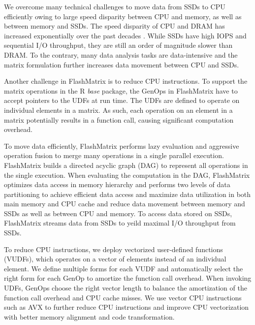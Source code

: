 We overcome many technical challenges to move data from SSDs to CPU efficiently
owing to large speed disparity between CPU and memory, as well as between memory and
SSDs. The speed disparity of CPU and DRAM has increased exponentially over
the past decades \cite{Wilkes01}. While SSDs have high IOPS and sequential
I/O throughput, they are still an order of magnitude slower than DRAM.
To the contrary, many data analysis tasks are data-intensive and the matrix
formulation further increases data movement between CPU and SSDs.%

Another challenge in FlashMatrix is to reduce CPU instructions. To support
the matrix operations in the R \textit{base} package, the GenOps in FlashMatrix
have to accept pointers to the UDFs at run time. The UDFs are defined to
operate on individual elements in a matrix. As such, each operation on an element
in a matrix potentially results in a function call, causing significant
computation overhead.

To move data efficiently, FlashMatrix performs lazy evaluation and aggressive
operation fusion to merge many operations in a single parallel execution.
FlashMatrix builds a directed acyclic graph (DAG) to represent all operations
in the single execution. When evaluating the computation in the DAG, FlashMatrix
optimizes data access in memory hierarchy and performs two levels of data
partitioning to achieve efficient data access and maximize data utilization in
both main memory and CPU cache and reduce data movement between memory and SSDs
as well as between CPU and memory. To access data stored on SSDs, FlashMatrix
streams data from SSDs to yeild maximal I/O throughput from SSDs.


To reduce CPU instructions, we deploy vectorized user-defined
functions (VUDFs), which operates on a vector of elements instead of
an individual element. We define multiple forms for each VUDF and automatically
select the right form for each GenOp to amortize the function call overhead.
When invoking UDFs, GenOps choose the right vector length to balance
the amortization of the function call overhead and CPU cache misses. We use
vector CPU instructions such as AVX \cite{avx} to further reduce CPU
instructions and improve CPU vectorization with better memory alignment
and code transformation.


